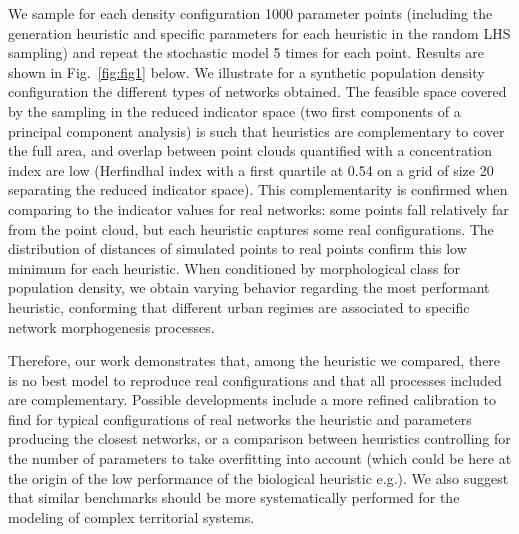 \documentclass[letterpaper]{article}
\begin{document}
We sample for each density configuration 1000 parameter points (including the generation heuristic and specific parameters for each heuristic in the random LHS sampling) and repeat the stochastic model 5 times for each point. Results are shown in Fig.~\ref{fig:fig1} below. We illustrate for a synthetic population density configuration the different types of networks obtained. The feasible space covered by the sampling in the reduced indicator space (two first components of a principal component analysis) is such that heuristics are complementary to cover the full area, and overlap between point clouds quantified with a concentration index are low (Herfindhal index with a first quartile at 0.54 on a grid of size 20 separating the reduced indicator space). This complementarity is confirmed when comparing to the indicator values for real networks: some points fall relatively far from the point cloud, but each heuristic captures some real configurations. The distribution of distances of simulated points to real points confirm this low minimum for each heuristic. When conditioned by morphological class for population density, we obtain varying behavior regarding the most performant heuristic, conforming that different urban regimes are associated to specific network morphogenesis processes.

Therefore, our work demonstrates that, among the heuristic we compared, there is no best model to reproduce real configurations and that all processes included are complementary. Possible developments include a more refined calibration to find for typical configurations of real networks the heuristic and parameters producing the closest networks, or a comparison between heuristics controlling for the number of parameters to take overfitting into account (which could be here at the origin of the low performance of the biological heuristic e.g.). We also suggest that similar benchmarks should be more systematically performed for the modeling of complex territorial systems.










\footnotesize

\end{document}

